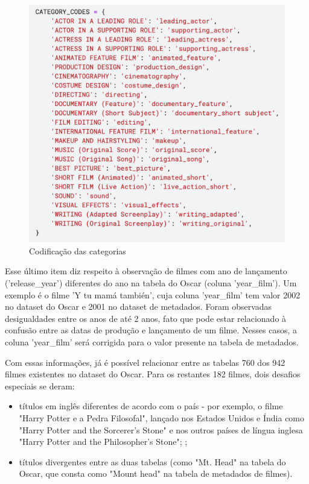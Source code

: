         \begin{figure}[htb]
        	\caption{\label{cat_cods}Codificação das categorias}
        	\begin{center}
        		\includegraphics[scale=0.7]{categ_codes.png}
        	\end{center}
        \end{figure}

        Esse último item diz respeito à observação de filmes com ano de lançamento ('release\_year') diferentes do ano na tabela do Oscar (coluna 'year\_film'). Um exemplo é o filme 'Y tu mamá también', cuja coluna 'year\_film' tem valor 2002 no dataset do Oscar e 2001 no dataset de metadados. Foram observadas desigualdades entre os anos de até 2 anos, fato que pode estar relacionado à confusão entre as datas de produção e lançamento de um filme. Nesses casos, a coluna 'year\_film' será corrigida para o valor presente na tabela de metadados.


        Com essas informações, já é possível relacionar entre as tabelas 760 dos 942 filmes existentes no dataset do Oscar. Para os restantes 182 filmes, dois desafios especiais se deram:\par

        \begin{itemize}
            \item títulos em inglês diferentes de acordo com o país - por exemplo, o filme "Harry Potter e a Pedra Filosofal", lançado nos Estados Unidos e Índia como "Harry Potter and the Sorcerer's Stone" e nos outros países de língua inglesa "Harry Potter and the Philosopher's Stone"; \cite{yahoo2000};\par
            \item títulos divergentes entre as duas tabelas (como "Mt. Head" na tabela do Oscar, que consta como "Mount head" na tabela de metadados de filmes).\par
        \end{itemize}

